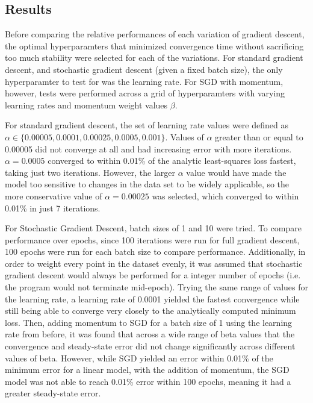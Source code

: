 \subsection{Results}
Before comparing the relative performances of each variation of gradient descent, the optimal hyperparamters that minimized convergence time without sacrificing too much stability were selected for each of the variations. For standard gradient descent, and stochastic gradient descent (given a fixed batch size), the only hyperparamter to test for was the learning rate. For SGD with momentum, however, tests were performed across a grid of hyperparamters with varying learning rates and momentum weight values $\beta$.

For standard gradient descent, the set of learning rate values were defined as $\alpha \in \{0.00005, 0.0001, 0.00025, 0.0005, 0.001\}$. Values of $\alpha$ greater than or equal to 0.00005 did not converge at all and had increasing error with more iterations. $\alpha = 0.0005$ converged to within 0.01\% of the analytic least-squares loss fastest, taking just two iterations. However, the larger $\alpha$ value would have made the model too sensitive to changes in the data set to be widely applicable, so the more conservative value of $\alpha = 0.00025$ was selected, which converged to within 0.01\% in just 7 iterations.

For Stochastic Gradient Descent, batch sizes of 1 and 10 were tried. To compare performance over epochs, since 100 iterations were run for full gradient descent, 100 epochs were run for each batch size to compare performance. Additionally, in order to weight every point in the dataset evenly, it was assumed that stochastic gradient descent would always be performed for a integer number of epochs (i.e. the program would not terminate mid-epoch). Trying the same range of values for the learning rate, a learning rate of 0.0001 yielded the fastest convergence while still being able to converge very closely to the analytically computed minimum loss. Then, adding momentum to SGD for a batch size of 1 using the learning rate from before, it was found that across a wide range of beta values that the convergence and steady-state error did not change significantly across different values of beta. However, while SGD yielded an error within 0.01\% of the minimum error for a linear model, with the addition of momentum, the SGD model was not able to reach 0.01\% error within 100 epochs, meaning it had a greater steady-state error.

